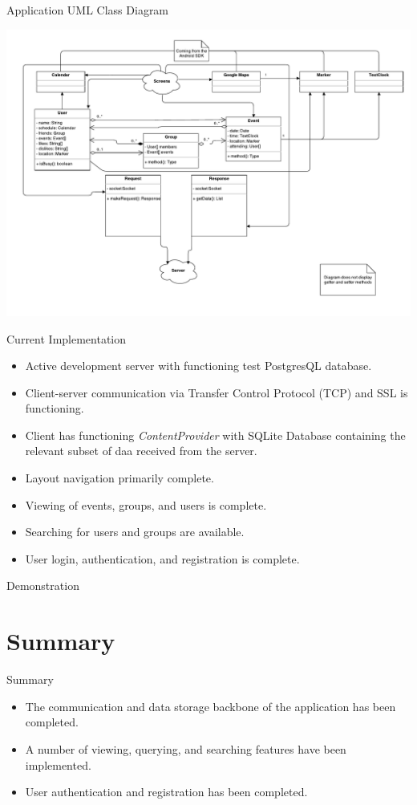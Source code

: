 \documentclass{beamer}
\begin{document}
\begin{frame}{Application UML Class Diagram}
\begin{center}
\includegraphics[scale=.4]{application.pdf}
\end{center}
\end{frame}

\begin{frame}{Current Implementation}
\begin{itemize}
\item Active development server with functioning test PostgresQL database.
\item Client-server communication via Transfer Control Protocol (TCP) and SSL is functioning.
\item Client has functioning \emph{ContentProvider} with SQLite Database containing the relevant
subset of daa received from the server.
\item Layout navigation primarily complete.
\item Viewing of events, groups, and users is complete.
\item Searching for users and groups are available. 
\item User login, authentication, and registration is complete.
\end{itemize}
\end{frame}

\begin{frame}{Demonstration}
\end{frame}

\section{Summary}
\begin{frame}{Summary}
\begin{itemize}
\item The communication and data storage backbone of the application has been completed.
\item A number of viewing, querying, and searching features have been implemented.
\item User authentication and registration has been completed.
\end{itemize}
\end{frame}
\end{document}
